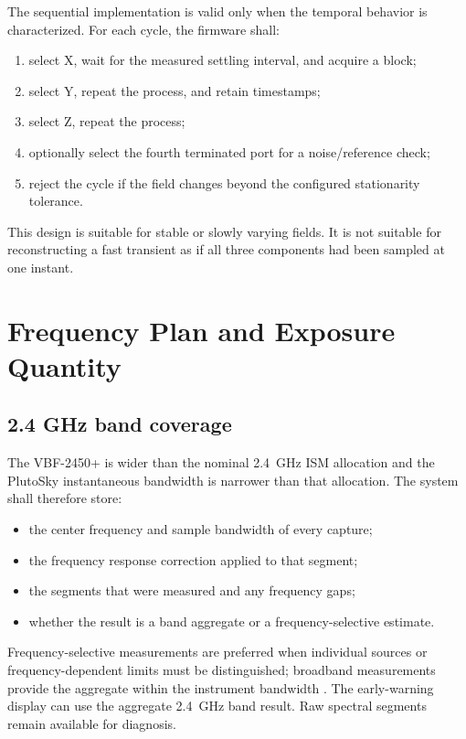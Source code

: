 \documentclass[11pt,a4paper]{article}
\begin{document}
The sequential implementation is valid only when the temporal behavior is characterized. For each cycle, the firmware shall:
\begin{enumerate}
  \item select X, wait for the measured settling interval, and acquire a block;
  \item select Y, repeat the process, and retain timestamps;
  \item select Z, repeat the process;
  \item optionally select the fourth terminated port for a noise/reference check;
  \item reject the cycle if the field changes beyond the configured stationarity tolerance.
\end{enumerate}

This design is suitable for stable or slowly varying fields. It is not suitable for reconstructing a fast transient as if all three components had been sampled at one instant.

\section{Frequency Plan and Exposure Quantity}

\subsection{2.4 GHz band coverage}
The VBF-2450+ is wider than the nominal 2.4~GHz ISM allocation and the PlutoSky instantaneous bandwidth is narrower than that allocation. The system shall therefore store:
\begin{itemize}
  \item the center frequency and sample bandwidth of every capture;
  \item the frequency response correction applied to that segment;
  \item the segments that were measured and any frequency gaps;
  \item whether the result is a band aggregate or a frequency-selective estimate.
\end{itemize}

Frequency-selective measurements are preferred when individual sources or frequency-dependent limits must be distinguished; broadband measurements provide the aggregate within the instrument bandwidth \cite[Sec.~9.2]{ITU-T-K.100}. The early-warning display can use the aggregate 2.4~GHz band result. Raw spectral segments remain available for diagnosis.
\end{document}
